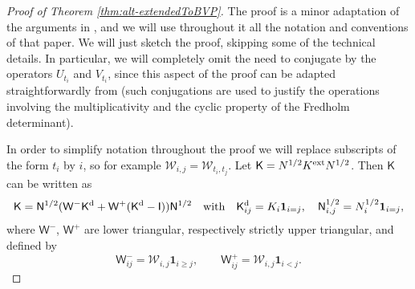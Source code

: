 \documentclass[letterpaper,reqno,11pt,oneside,final]{amsart}
\theoremstyle{definition}
\newcommand{\uno}[1]{\mathbf{1}_{#1}}
\newcommand{\uptext}[1]{\text{\upshape{#1}}}
\newcommand{\cw}{\mathcal{W}}
\newcommand{\sW}{\mathsf{W}}
\newcommand{\sK}{\mathsf{K}}
\newcommand{\sQ}{\mathsf{N}}
\newcommand{\sI}{\mathsf{I}}
\newcommand{\Ml}{N}
\numberwithin{equation}{section}
\begin{document}
\begin{proof}[Proof of Theorem \ref{thm:alt-extendedToBVP}]
  The proof is a minor adaptation of the arguments in \cite[Thm. 3.3]{bcr}, and we will use throughout it all the notation and conventions of that paper.
  We will just sketch the proof, skipping some of the technical details.
  In particular, we will completely omit the need to conjugate by the operators $U_{t_i}$ and $V_{t_i}$, since this aspect of the proof can be adapted straightforwardly from \cite{bcr} (such conjugations are used to justify the operations involving the multiplicativity and the cyclic property of the Fredholm determinant).

  In order to simplify notation throughout the proof we will replace subscripts of the form $t_i$ by $i$, so for example $\cw_{i,j}=\cw_{t_i,t_j}$.
  Let $\sK=\Ml^{1/2}K^\uptext{ext}\Ml^{1/2}$. Then $\sK$ can
  be written as
  \begin{equation}\label{eq:sK}
    \sK=\sQ^{1/2}(\sW^{-}\sK^\uptext{d}+\sW^{+}(\sK^\uptext{d}-\sI))\sQ^{1/2}\quad\text{with}\quad
    \sK^\uptext{d}_{ij}=K_{i}\uno{i=j},\quad \sQ_{i,j}^{1/2}=\Ml_{{i}}^{1/2}\uno{i=j},
  \end{equation}
  where $\sW^{-}$, $\sW^{+}$ are lower triangular, respectively strictly upper triangular, and defined by
  \begin{equation*}
    \sW^{-}_{ij} = \cw_{i,j}\uno{i\geq j},\qquad
    \sW^{+}_{ij}=\cw_{{i},{j}}\uno{i < j}.
  \end{equation*}
  

\end{proof}
\end{document}
